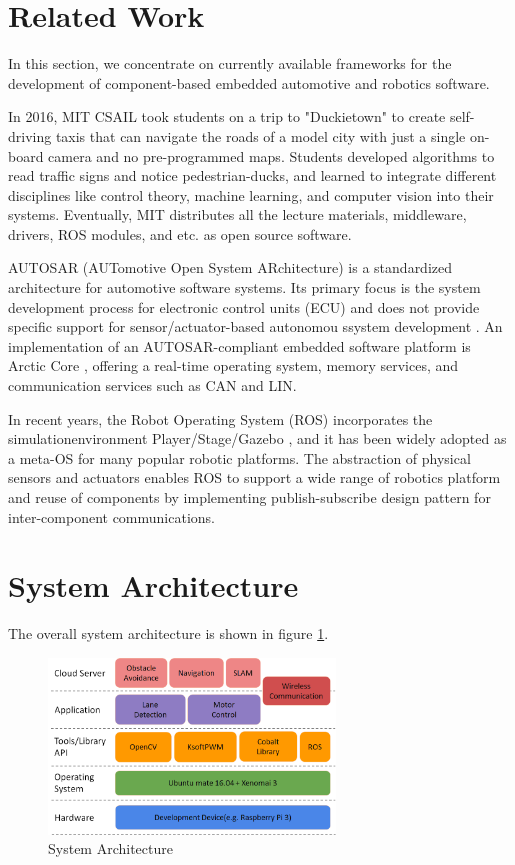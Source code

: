 \documentclass[conference]{IEEEtran}
\begin{document}
\section{Related Work}

In this section, we concentrate on currently available frameworks for the development of component-based embedded automotive and robotics software.

In 2016, MIT CSAIL took students on a trip to "Duckietown" \cite{Duckietown} to create self-driving taxis that can navigate the roads of a model city with just a single on-board camera and no pre-programmed maps. Students developed algorithms to read traffic signs and notice pedestrian-ducks, and learned to integrate different disciplines like control theory, machine learning, and computer vision into their systems. Eventually, MIT distributes all the lecture materials, middleware, drivers, ROS modules, and etc. as open source software.

AUTOSAR (AUTomotive Open System ARchitecture) is a standardized architecture for automotive software systems. Its primary focus is the system development process for electronic control units (ECU) and does not provide specific support for sensor/actuator-based autonomou ssystem development \cite{rtes}. An implementation of an AUTOSAR-compliant embedded software platform is Arctic Core \cite{arctic-core}, offering a real-time operating system, memory services, and communication services such as CAN and LIN.

In recent years, the Robot Operating System (ROS) \cite{ROS} incorporates the simulationenvironment Player/Stage/Gazebo \cite{player/stage}, and it has been widely adopted as a meta-OS for many popular robotic platforms. The abstraction of physical sensors and actuators enables ROS to support a wide range of robotics platform and reuse of components by implementing publish-subscribe design pattern for inter-component communications.

\section{System Architecture}

The overall system architecture is shown in figure \ref{fig:overall_arch}.

\begin{figure}
	\centering
	\includegraphics[width=3in]{img/arch.png}
	\caption{System Architecture}
	\label{fig:overall_arch}
\end{figure}
\end{document}
